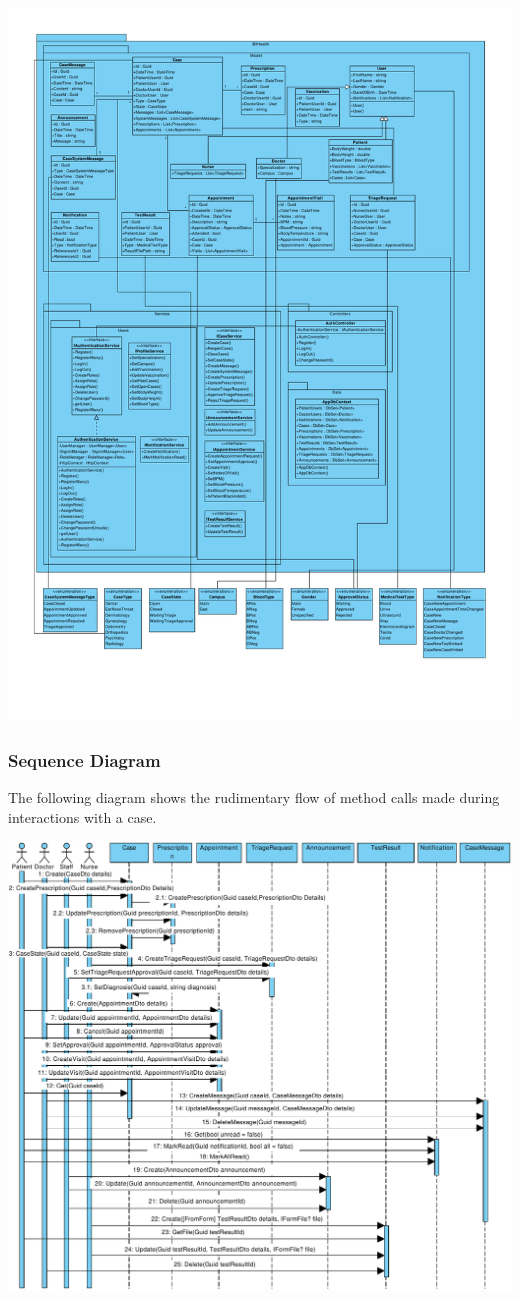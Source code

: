 \documentclass[a4paper, 12pt, titlepage]{article}
\begin{document}
  \includegraphics[width=\linewidth]{class_diag}

  \subsubsection{Sequence Diagram}

  The following diagram shows the rudimentary flow of method calls made during interactions with a case.

  \includegraphics[width=\linewidth]{sequence_diag}
\end{document}
